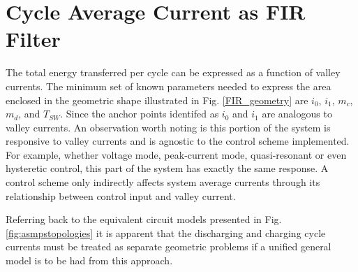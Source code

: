 \documentclass[conference]{IEEEtran}
\begin{document}
\section{Cycle Average Current as FIR Filter}
The total energy transferred per cycle can be expressed as a function of valley currents. The minimum set of known parameters needed to express the area enclosed in the geometric shape illustrated in Fig. \ref{FIR_geometry} are $i_0$, $i_1$, $m_c$, $m_d$, and $T_{SW}$. Since the anchor points identifed as $i_0$ and $i_1$ are analogous to valley currents.  An observation worth noting is this portion of the system is responsive to valley currents and is agnostic to the control scheme implemented.  For example, whether voltage mode, peak-current mode, quasi-resonant or even hysteretic control, this part of the system has exactly the same response. A control scheme only indirectly affects system average currents through its relationship between control input and valley current.

Referring back to the equivalent circuit models presented in Fig. \ref{fig:asmpstopologies} it is apparent that the discharging and charging cycle currents must be treated as separate geometric problems if a unified general model is to be had from this approach.
\end{document}
